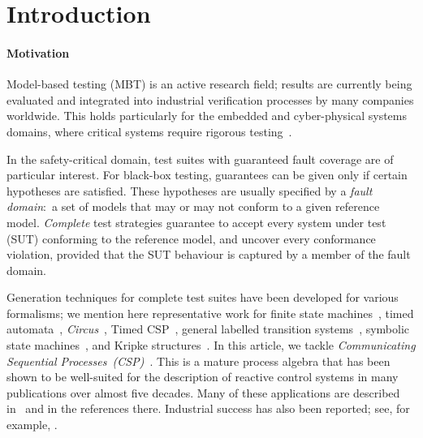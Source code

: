 
\section{Introduction}
\label{sec:intro}


\paragraph{Motivation}
Model-based testing (MBT) is an active research field; results are currently
being evaluated and integrated into industrial verification processes by many
companies worldwide. This holds particularly for the embedded and
cyber-physical systems domains, where critical systems require rigorous
testing~\cite{jp2018ets,DBLP:conf/isola/0001BH18}.

In the safety-critical domain, test suites with guaranteed fault coverage are
of particular interest. For black-box testing, guarantees can be given only
if certain hypotheses are satisfied. These hypotheses are usually specified
by a \emph{fault domain}:~a set of models that may or may not conform to a
given reference model. \emph{Complete} test strategies guarantee to accept
every  system under test (SUT) conforming to the reference model, and uncover
every conformance violation, provided that the SUT behaviour is captured by a
member of the fault domain.

Generation techniques for complete test suites have been developed for
various formalisms; we mention here representative work for finite state
machines~\cite{hierons_testing_2004,simao_reducing_2012}, timed
automata~\cite{Springintveld2001}, {\sf\em
Circus}~\cite{DBLP:journals/acta/CavalcantiG11}, Timed
CSP~\cite{Schneider:1995:OST:203471.203475}, general labelled transition
systems~\cite{DBLP:journals/cn/Tretmans96}, symbolic state
machines~\cite{DBLP:conf/icst/Petrenko16}, and Kripke
structures~\cite{Huang2017}. In this article, we tackle \emph{Communicating
Sequential Processes~(CSP)}~\cite{Hoare:1985:CSP:3921,Roscoe2010}. This is a
mature process algebra that has been shown to be well-suited for the
description of reactive control systems in many publications over almost five
decades. Many of these applications are described in~\cite{Roscoe2010} and in
the references there. Industrial success has also been reported; see, for
example, \cite{976937,DBLP:conf/prdc/ShiPK99,DBLP:conf/amast/ButhKPS97}.

